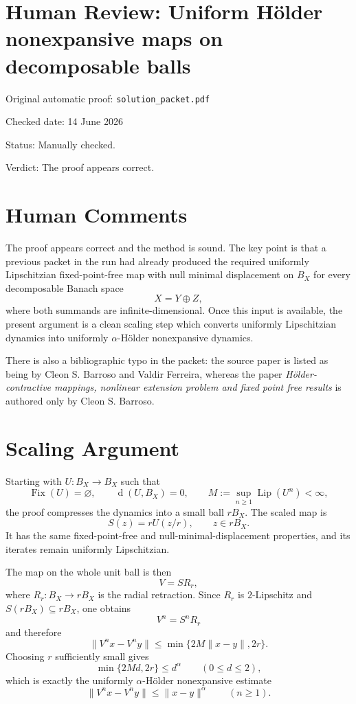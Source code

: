 \documentclass[11pt]{article}
\newcommand{\Fix}{\operatorname{Fix}}
\newcommand{\Lip}{\operatorname{Lip}}
\newcommand{\dist}{\operatorname{d}}
\begin{document}
\section*{Human Review: Uniform H\"older nonexpansive maps on decomposable balls}

\noindent Original automatic proof: \texttt{solution\_packet.pdf}

\noindent Checked date: 14 June 2026

\noindent Status: Manually checked.

\noindent Verdict: The proof appears correct.

\section*{Human Comments}

The proof appears correct and the method is sound. The key point is that a
previous packet in the run had already produced the required uniformly
Lipschitzian fixed-point-free map with null minimal displacement on \(B_X\) for
every decomposable Banach space
\[
  X=Y\oplus Z,
\]
where both summands are infinite-dimensional. Once this input is available, the
present argument is a clean scaling step which converts uniformly Lipschitzian
dynamics into uniformly \(\alpha\)-H\"older nonexpansive dynamics.

There is also a bibliographic typo in the packet: the source paper is listed as
being by Cleon S. Barroso and Valdir Ferreira, whereas the paper
\emph{H\"older-contractive mappings, nonlinear extension problem and fixed point
free results} is authored only by Cleon S. Barroso.

\section*{Scaling Argument}

Starting with \(U:B_X\to B_X\) such that
\[
  \Fix(U)=\varnothing,\qquad
  \dist(U,B_X)=0,\qquad
  M:=\sup_{n\geq1}\Lip(U^n)<\infty,
\]
the proof compresses the dynamics into a small ball \(rB_X\). The scaled map is
\[
  S(z)=rU(z/r),\qquad z\in rB_X.
\]
It has the same fixed-point-free and null-minimal-displacement properties, and
its iterates remain uniformly Lipschitzian.

The map on the whole unit ball is then
\[
  V=S R_r,
\]
where \(R_r:B_X\to rB_X\) is the radial retraction. Since \(R_r\) is
\(2\)-Lipschitz and \(S(rB_X)\subseteq rB_X\), one obtains
\[
  V^n=S^nR_r
\]
and therefore
\[
  \|V^n x-V^n y\|
  \leq
  \min\{2M\|x-y\|,2r\}.
\]
Choosing \(r\) sufficiently small gives
\[
  \min\{2M d,2r\}\leq d^\alpha
  \qquad(0\leq d\leq2),
\]
which is exactly the uniformly \(\alpha\)-H\"older nonexpansive estimate
\[
  \|V^n x-V^n y\|\leq \|x-y\|^\alpha
  \qquad(n\geq1).
\]
\end{document}
